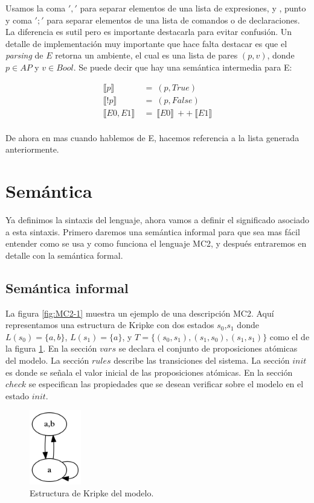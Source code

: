 \noindent Usamos la coma $','$ para separar elementos de una lista de expresiones, y , punto y coma $';'$ para separar elementos de una lista de comandos o de declaraciones. La diferencia es sutil pero es importante destacarla para evitar confusión.
Un detalle de implementación muy importante que hace falta destacar es que el \emph{parsing} de $E$ retorna un ambiente, el cual es una lista de pares $(p,v)$, donde $p \in AP$ y $v \in Bool$. Se puede decir que hay una semántica intermedia para E:

\begin{align*}
\llbracket p \rrbracket \ &=\ (p,True)\\
\llbracket !p \rrbracket \ &=\ (p,False) \\
\llbracket E0,E1 \rrbracket \ &=\ \llbracket E0 \rrbracket \ ++\ \llbracket E1 \rrbracket  \\
\end{align*}

De ahora en mas cuando hablemos de E, hacemos referencia a la lista generada anteriormente.

\section{Semántica}

Ya definimos la sintaxis del lenguaje, ahora vamos a definir el significado asociado a esta sintaxis. Primero daremos una semántica informal para que sea mas fácil entender como se usa y como funciona el lenguaje MC2, y después entraremos en detalle con la semántica formal.

\subsection{Semántica informal}

La figura \ref{fig:MC2-1} muestra un ejemplo de una descripción MC2. Aquí representamos una estructura de Kripke con dos estados $s_{0}$,$s_{1}$ donde $L(s_{0}) = \{a,b\}$, $L(s_{1}) = \{a\}$, y $T = \{(s_{0},s_{1}),(s_{1},s_{0}),(s_{1},s_{1})\}$ como el de la figura \ref{fig:kripke4}. En la sección $vars$ se declara el conjunto de proposiciones atómicas del modelo. La sección $rules$ describe las transiciones del sistema. La sección $init$ es donde se señala el valor inicial de las proposiciones atómicas. En la sección $check$ se especifican las propiedades que se desean verificar sobre el modelo en el estado $init$.

\begin{figure}[H]
  \centering
  \includegraphics[width=0.2\textwidth]{Figures/kripke4.png}
  \caption{Estructura de Kripke del modelo.}
  \label{fig:kripke4}
\end{figure}

